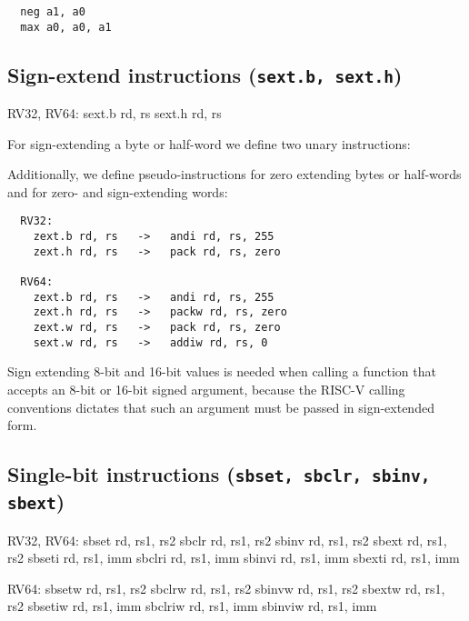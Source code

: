 \begin{minipage}{\linewidth}
\begin{verbatim}
  neg a1, a0
  max a0, a0, a1
\end{verbatim}
\end{minipage}


\subsection{Sign-extend instructions (\texttt{sext.b, sext.h})}

\begin{rvb}
  RV32, RV64:
    sext.b rd, rs
    sext.h rd, rs
\end{rvb}

For sign-extending a byte or half-word we define two unary instructions:



Additionally, we define pseudo-instructions for zero extending bytes or
half-words and for zero- and sign-extending words:

\begin{minipage}{\linewidth}
\begin{verbatim}
  RV32:
    zext.b rd, rs   ->   andi rd, rs, 255
    zext.h rd, rs   ->   pack rd, rs, zero

  RV64:
    zext.b rd, rs   ->   andi rd, rs, 255
    zext.h rd, rs   ->   packw rd, rs, zero
    zext.w rd, rs   ->   pack rd, rs, zero
    sext.w rd, rs   ->   addiw rd, rs, 0
\end{verbatim}
\end{minipage}

Sign extending 8-bit and 16-bit values is needed when calling a function that
accepts an 8-bit or 16-bit signed argument, because the RISC-V calling
conventions dictates that such an argument must be passed in sign-extended
form.


\subsection{Single-bit instructions (\texttt{sbset, sbclr, sbinv, sbext})}

\begin{rvb}
  RV32, RV64:
    sbset  rd, rs1, rs2
    sbclr  rd, rs1, rs2
    sbinv  rd, rs1, rs2
    sbext  rd, rs1, rs2
    sbseti rd, rs1, imm
    sbclri rd, rs1, imm
    sbinvi rd, rs1, imm
    sbexti rd, rs1, imm

  RV64:
    sbsetw  rd, rs1, rs2
    sbclrw  rd, rs1, rs2
    sbinvw  rd, rs1, rs2
    sbextw  rd, rs1, rs2
    sbsetiw rd, rs1, imm
    sbclriw rd, rs1, imm
    sbinviw rd, rs1, imm
\end{rvb}


